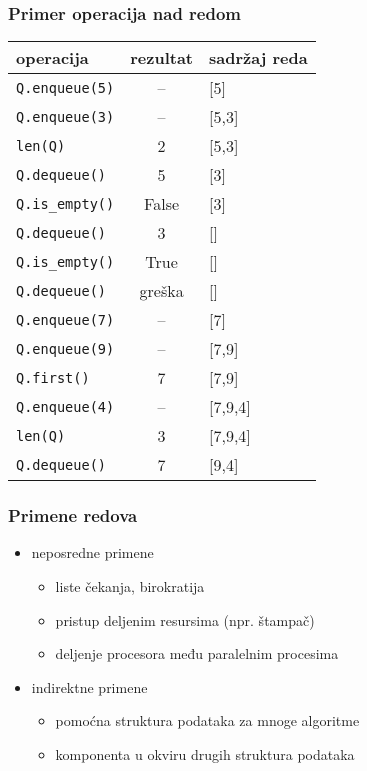 \documentclass[compress,aspectratio=169]{beamer}
\begin{document}
\begin{frame}[fragile,shrink=10]
  \frametitle{Primer operacija nad redom}
\begin{center}
\begin{tabular}{lcl}
\textbf{operacija} & \textbf{rezultat} & \textbf{sadržaj reda} \\
\hline \hline
\texttt{Q.enqueue(5)} & -- & [5] \\ 
\texttt{Q.enqueue(3)} & -- & [5,3] \\ 
\texttt{len(Q)} & 2 & [5,3] \\ 
\texttt{Q.dequeue()} & 5 & [3] \\ 
\texttt{Q.is\_empty()} & False & [3] \\ 
\texttt{Q.dequeue()} & 3 & [] \\ 
\texttt{Q.is\_empty()} & True & [] \\ 
\texttt{Q.dequeue()} & greška & [] \\ 
\texttt{Q.enqueue(7)} & -- & [7] \\ 
\texttt{Q.enqueue(9)} & -- & [7,9] \\ 
\texttt{Q.first()} & 7 & [7,9] \\ 
\texttt{Q.enqueue(4)} & -- & [7,9,4] \\ 
\texttt{len(Q)} & 3 & [7,9,4] \\ 
\texttt{Q.dequeue()} & 7 & [9,4] \\ 
\end{tabular}
\end{center}
\end{frame}

\begin{frame}[fragile]
  \frametitle{Primene redova}
  \begin{itemize}
    \item neposredne primene
    \begin{itemize}
      \item liste čekanja, birokratija
      \item pristup deljenim resursima (npr. štampač)
      \item deljenje procesora među paralelnim procesima
    \end{itemize}
    \item indirektne primene
    \begin{itemize}
      \item pomoćna struktura podataka za mnoge algoritme
      \item komponenta u okviru drugih struktura podataka
    \end{itemize}
  \end{itemize}
\end{frame}
\end{document}
